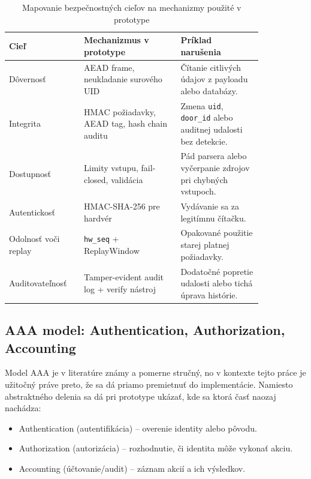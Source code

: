 \documentclass[journal,a4paper,onecolumn]{IEEEtran}
\begin{document}
\begin{table}[!ht]
\renewcommand{\arraystretch}{1.3}
\centering
\caption{Mapovanie bezpečnostných cieľov na mechanizmy použité v prototype}
\label{tab:security_mapping}
\small
\begin{tabular}{p{0.22\linewidth} p{0.33\linewidth} p{0.29\linewidth}}
\toprule
\textbf{Cieľ} & \textbf{Mechanizmus v prototype} & \textbf{Príklad narušenia} \\
\midrule
Dôvernosť & AEAD frame, neukladanie surového UID & Čítanie citlivých údajov z payloadu alebo databázy. \\
Integrita & HMAC požiadavky, AEAD tag, hash chain auditu & Zmena \texttt{uid}, \texttt{door\_id} alebo auditnej udalosti bez detekcie. \\
Dostupnosť & Limity vstupu, fail-closed, validácia & Pád parsera alebo vyčerpanie zdrojov pri chybných vstupoch. \\
Autentickosť & HMAC-SHA-256 pre hardvér & Vydávanie sa za legitímnu čítačku. \\
Odolnosť voči replay & \texttt{hw\_seq} + ReplayWindow & Opakované použitie starej platnej požiadavky. \\
Auditovateľnosť & Tamper-evident audit log + verify nástroj & Dodatočné popretie udalosti alebo tichá úprava histórie. \\
\bottomrule
\end{tabular}
\normalsize
\end{table}

\subsection{AAA model: Authentication, Authorization, Accounting}

Model AAA je v literatúre známy a pomerne stručný, no v kontexte tejto práce je užitočný práve preto, že sa dá priamo premietnuť do implementácie. Namiesto abstraktného delenia sa dá pri prototype ukázať, kde sa ktorá časť naozaj nachádza:

\begin{itemize}[leftmargin=*,itemsep=2pt]
  \item Authentication (autentifikácia) -- overenie identity alebo pôvodu.
  \item Authorization (autorizácia) -- rozhodnutie, či identita môže vykonať akciu.
  \item Accounting (účtovanie/audit) -- záznam akcií a ich výsledkov.
\end{itemize}
\end{document}
